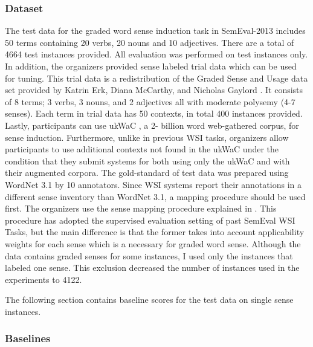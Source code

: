 
\subsubsection{Dataset} 


The test data for the graded word sense induction task in SemEval-2013 includes 50 terms containing 20 verbs, 20 nouns and 10 adjectives. There are a total of 4664 test instances provided. All evaluation was performed on test instances only. In addition, the organizers provided sense labeled trial data which can be used for tuning. This trial data is a redistribution of the Graded Sense and Usage data set provided by Katrin Erk, Diana McCarthy, and Nicholas Gaylord \cite{erk09graded}. It consists of 8 terms; 3 verbs, 3 nouns, and 2 adjectives all with moderate polysemy (4-7 senses). Each term in trial data has 50 contexts, in total 400 instances provided. Lastly, participants can use ukWaC \cite{ukWaC}, a 2- billion word web-gathered corpus, for sense induction. Furthermore, unlike in previous WSI tasks, organizers allow participants to use additional contexts not found in the ukWaC under the condition that they submit systems for both using only the ukWaC and with their augmented corpora. The gold-standard of test data was prepared using WordNet 3.1 by 10 annotators. Since WSI systems report their annotations in a different sense inventory than WordNet 3.1, a mapping procedure should be used first. The organizers use the sense mapping procedure explained in \cite{jurgens12evaluation}. This procedure has adopted the supervised evaluation setting of past SemEval WSI Tasks, but the main difference is that the former takes into account applicability weights for each sense which is a necessary for graded word sense. Although the data contains graded senses for some instances, I used only the instances that labeled one sense. This exclusion decreased the number of instances used in the experiments to 4122. 


The following section contains baseline scores for the test data on single sense instances.

\subsubsection{Baselines}

